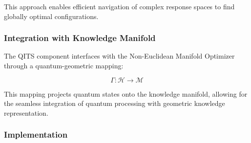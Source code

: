 \documentclass[journal,onecolumn]{IEEEtran}
\begin{document}
This approach enables efficient navigation of complex response spaces to find globally optimal configurations.

\subsubsection{Integration with Knowledge Manifold}

The QITS component interfaces with the Non-Euclidean Manifold Optimizer through a quantum-geometric mapping:

\begin{equation}
\Gamma: \mathcal{H} \rightarrow \mathcal{M}
\end{equation}

This mapping projects quantum states onto the knowledge manifold, allowing for the seamless integration of quantum processing with geometric knowledge representation.

\subsubsection{Implementation}
\end{document}

